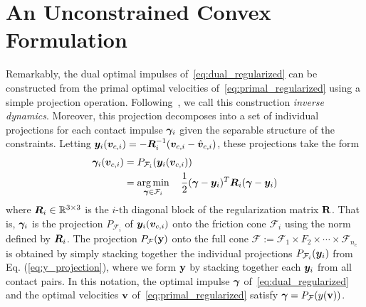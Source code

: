 \section{An Unconstrained Convex Formulation}
\label{sec:unconstrained_convex_formulation}
Remarkably,  the dual optimal impulses of~\eqref{eq:dual_regularized} can be constructed from 
the primal optimal velocities of~\eqref{eq:primal_regularized}
using a simple projection operation. 
 Following~\cite{bib:todorov2014}, we call this construction  \textit{inverse dynamics}. 
 Moreover, this projection
decomposes into a set of individual projections for each
contact impulse ${\bm\gamma}_i$ given the separable structure of the constraints.
Letting ${\bm{y}}_i({\bm{v}}_{c,i}) = -{\bm{R}}_i^{-1}({\bm{v}}_{c,i}-\hat{{\bm{v}}}_{c,i})$,
these projections take the form
\begin{equation}
  \begin{aligned}
	\bgamma_i(\vf{v}_{c,i})&= P_{\mathcal{F}_i}(\vf{y}_i(\vf{v}_{c,i}))\\
	&= \argmin_{\bgamma\in\mathcal{F}_i} \quad 
		\frac{1}{2}(\bgamma-\vf{y}_i)^T\vf{R}_i(\bgamma-\vf{y}_i)\\
	\end{aligned}
	\label{eq:y_projection}
\end{equation}
where ${\bm{R}}_i\in\mathbb{R}^{3\times3}$ is the $i\text{-th}$ diagonal block of
the regularization matrix ${\mathbf{R}}$. That is, ${\bm\gamma}_i$ is the projection
$P_{\mathcal{F}_i}$ of ${\bm{y}}_i({\bm{v}}_{c,i})$ onto the friction cone
$\mathcal{F}_i$ using the norm defined by ${\bm{R}}_i$.
The projection $P_{\mathcal{F}}({\mathbf{y}})$ onto 
the full cone $\mathcal{F} :=
\mathcal{F}_1 \times F_2 \times \cdots \times \mathcal{F}_{n_c}$ 
is obtained by simply stacking together the individual projections
$P_{\mathcal{F}_i}({\bm{y}}_i)$ from Eq. (\ref{eq:y_projection}),
where we form ${\mathbf{y}}$ by stacking together each
${\bm{y}}_i$ from all contact pairs.  In this notation,
the optimal impulse ${\bm\gamma}$ of~\eqref{eq:dual_regularized} 
and the optimal velocities ${\mathbf{v}}$ of~\eqref{eq:primal_regularized} 
satisfy  ${\bm\gamma} = P_{\mathcal{F}}(y({\mathbf{v}}))$.


